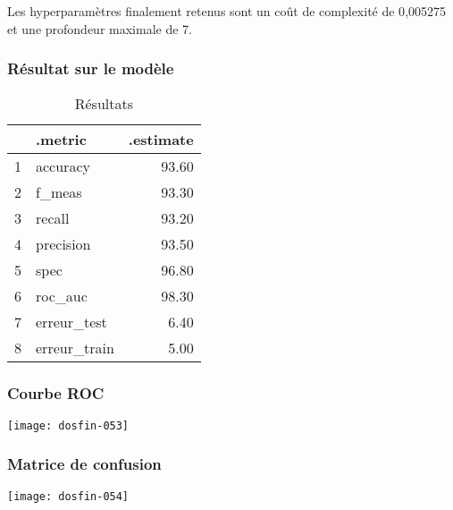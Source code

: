 \documentclass[a4paper,11pt]{article}
\begin{document}
Les hyperparamètres finalement retenus sont un coût de complexité de 0{,}005275 et une profondeur maximale de 7.



\newpage

\subsubsection{Résultat sur le modèle}

\begin{center}


\begin{table}[ht]
\centering
\begin{tabular}{rlr}
  \hline
 & .metric & .estimate \\ 
  \hline
1 & accuracy & 93.60 \\ 
  2 & f\_meas & 93.30 \\ 
  3 & recall & 93.20 \\ 
  4 & precision & 93.50 \\ 
  5 & spec & 96.80 \\ 
  6 & roc\_auc & 98.30 \\ 
  7 & erreur\_test & 6.40 \\ 
  8 & erreur\_train & 5.00 \\ 
   \hline
\end{tabular}
\caption{Résultats} 
\end{table}
\end{center}

\subsubsection{Courbe ROC}

\begin{center}

\texttt{[image: dosfin-053]}

\end{center}

\subsubsection{Matrice de confusion}

\begin{center}

\texttt{[image: dosfin-054]}

\end{center}
\end{document}
